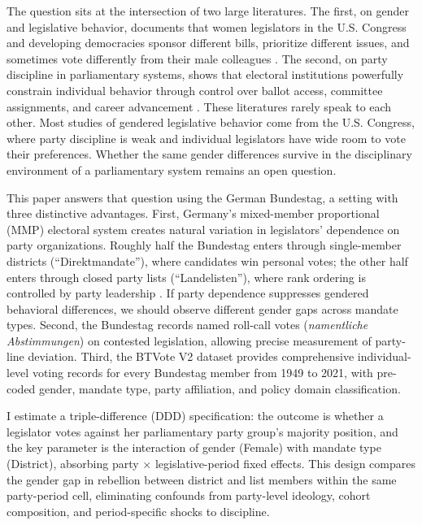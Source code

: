 \documentclass[12pt]{article}
\begin{document}
The question sits at the intersection of two large literatures. The first, on gender and legislative behavior, documents that women legislators in the U.S. Congress and developing democracies sponsor different bills, prioritize different issues, and sometimes vote differently from their male colleagues \citep{swers2002, washington2008, chattopadhyay2004, clots2012}. The second, on party discipline in parliamentary systems, shows that electoral institutions powerfully constrain individual behavior through control over ballot access, committee assignments, and career advancement \citep{carey2006, saalfeld2003, cox2005}. These literatures rarely speak to each other. Most studies of gendered legislative behavior come from the U.S. Congress, where party discipline is weak and individual legislators have wide room to vote their preferences. Whether the same gender differences survive in the disciplinary environment of a parliamentary system remains an open question.

This paper answers that question using the German Bundestag, a setting with three distinctive advantages. First, Germany's mixed-member proportional (MMP) electoral system creates natural variation in legislators' dependence on party organizations. Roughly half the Bundestag enters through single-member districts (``Direktmandate''), where candidates win personal votes; the other half enters through closed party lists (``Landelisten''), where rank ordering is controlled by party leadership \citep{bawn1999, stratmann2006}. If party dependence suppresses gendered behavioral differences, we should observe different gender gaps across mandate types. Second, the Bundestag records named roll-call votes (\textit{namentliche Abstimmungen}) on contested legislation, allowing precise measurement of party-line deviation. Third, the BTVote V2 dataset \citep{btvote2023} provides comprehensive individual-level voting records for every Bundestag member from 1949 to 2021, with pre-coded gender, mandate type, party affiliation, and policy domain classification.

I estimate a triple-difference (DDD) specification: the outcome is whether a legislator votes against her parliamentary party group's majority position, and the key parameter is the interaction of gender (Female) with mandate type (District), absorbing party $\times$ legislative-period fixed effects. This design compares the gender gap in rebellion between district and list members within the same party-period cell, eliminating confounds from party-level ideology, cohort composition, and period-specific shocks to discipline.
\end{document}
